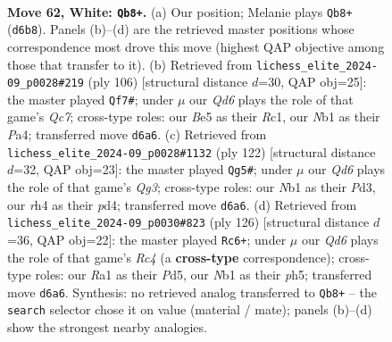 \documentclass[11pt]{article}
\begin{document}
\clearpage

\begin{figure}[p]\centering
\begin{subfigure}{0.46\textwidth}\centering
\resizebox{\linewidth}{!}{%
\newchessgame
\chessboard[
  setfen={8/k7/3Q4/p2pBp2/P6r/8/8/RN4K1 w - - 4 62},
  showmover=false,
  pgfstyle=straightmove, color=movearrow, markmove={d6-b8}
]}
\caption{}
\end{subfigure}\hfill
\begin{subfigure}{0.46\textwidth}\centering
\resizebox{\linewidth}{!}{%
\newchessgame
\chessboard[
  setfen={5k1r/p1Q5/1p4B1/6p1/P7/8/8/2R3K1 w - - 3 54},
  showmover=false,
  pgfstyle=straightmove, color=movearrow, markmove={c7-f7}
]}
\caption{}
\end{subfigure}
\\[4pt]
\begin{subfigure}{0.46\textwidth}\centering
\resizebox{\linewidth}{!}{%
\newchessgame
\chessboard[
  setfen={8/5K2/2p5/7k/P2p1B2/3P2Qp/8/8 w - - 3 62},
  showmover=false,
  pgfstyle=straightmove, color=movearrow, markmove={g3-g5}
]}
\caption{}
\end{subfigure}\hfill
\begin{subfigure}{0.46\textwidth}\centering
\resizebox{\linewidth}{!}{%
\newchessgame
\chessboard[
  setfen={8/5P2/1k1b4/3P2Pp/2R1B3/2p3r1/4K3/8 w - - 2 64},
  showmover=false,
  pgfstyle=straightmove, color=movearrow, markmove={c4-c6}
]}
\caption{}
\end{subfigure}
\caption{\textbf{Move 62, White: \texttt{Qb8+}.} (a) Our position; Melanie plays \texttt{Qb8+} (\texttt{d6b8}). Panels (b)--(d) are the retrieved master positions whose correspondence most drove this move (highest QAP objective among those that transfer to it). (b) Retrieved from \texttt{lichess\_elite\_2024-09\_p0028\#219} (ply 106) [structural distance $d$=30, QAP obj=25]: the master played \texttt{Qf7\#}; under $\mu$ our \emph{Qd6} plays the role of that game's \emph{Qc7}; cross-type roles: our \emph{B}e5 as their \emph{R}c1, our \emph{N}b1 as their \emph{P}a4; transferred move \texttt{d6a6}. (c) Retrieved from \texttt{lichess\_elite\_2024-09\_p0028\#1132} (ply 122) [structural distance $d$=32, QAP obj=23]: the master played \texttt{Qg5\#}; under $\mu$ our \emph{Qd6} plays the role of that game's \emph{Qg3}; cross-type roles: our \emph{N}b1 as their \emph{P}d3, our \emph{r}h4 as their \emph{p}d4; transferred move \texttt{d6a6}. (d) Retrieved from \texttt{lichess\_elite\_2024-09\_p0030\#823} (ply 126) [structural distance $d$=36, QAP obj=22]: the master played \texttt{Rc6+}; under $\mu$ our \emph{Qd6} plays the role of that game's \emph{Rc4} (a \textbf{cross-type} correspondence); cross-type roles: our \emph{R}a1 as their \emph{P}d5, our \emph{N}b1 as their \emph{p}h5; transferred move \texttt{d6a6}. Synthesis: no retrieved analog transferred to \texttt{Qb8+} -- the \texttt{search} selector chose it on value (material / mate); panels (b)--(d) show the strongest nearby analogies.}
\label{fig:thought-m122}
\end{figure}
\end{document}
